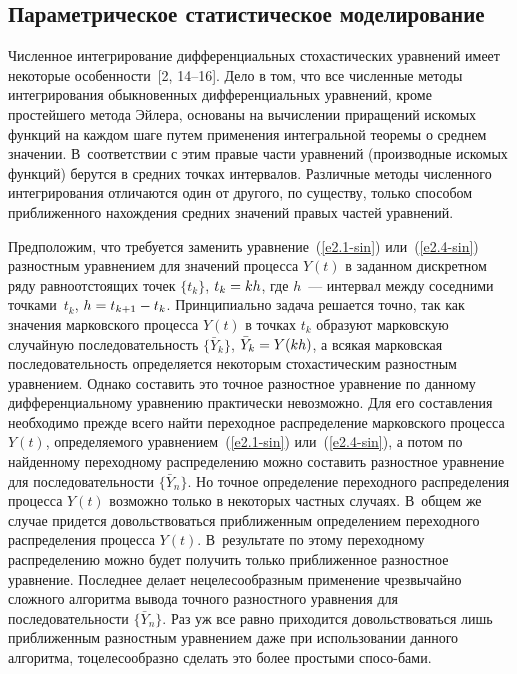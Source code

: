 \begin{multicols}{2}
\vspace*{-9pt}

\section{Параметрическое статистическое моделирование}

\vspace*{-2pt}

Численное интегрирование  дифференциальных стохастических
уравнений имеет некоторые особенности~[2, 14--16]. Дело в том, что все чис\-лен\-ные
методы интегрирования обыкновенных дифференциальных уравнений, кроме
простейшего метода Эйлера, основаны на вычислении приращений искомых
функций на каждом шаге путем применения интегральной теоремы о среднем
значении. В~соответствии с этим правые части уравнений (производные
искомых функций) берутся в средних точках интервалов.
Различные методы численного ин\-тег\-ри\-ро\-вания отличаются один от другого, по существу,
только способом приближенного нахождения средних значений правых частей уравнений.

Предположим, что требуется заменить уравнение~(\ref{e2.1-sin}) или~(\ref{e2.4-sin})  разностным
уравнением для значений процесса $Y(t)$ в заданном дискретном ряду
равноотстоящих точек $\{t_k\}$, $t_k\hm=kh$, где $h$~--- интервал между
соседними точками~$t_k$, $h\hm=t_{k+1}\hm-t_k$. Принципиально  задача
решается точно, так как значения марковского процесса $Y(t)$ в точках
$t_k$ образуют марковскую случайную последовательность $\{\bar Y_k\}$,
$\bar Y_k\hm=Y(kh)$, а всякая марковская последовательность определяется
некоторым стохастическим разностным уравнением. Однако составить это
точное разностное уравнение по данному дифференциальному уравнению
практически невозможно. Для его составления необходимо прежде всего
найти переходное распределение марковского процесса $Y(t)$,
определяемого уравнением~(\ref{e2.1-sin}) или~(\ref{e2.4-sin}), а потом по найденному переходному
распределению можно составить разностное уравнение для
последовательности $\{\bar Y_n\}$. Но точное определение переходного
распределения процесса $Y(t)$ возможно только в некоторых частных
случаях. В~общем же случае придется довольствоваться приближенным
определением переходного распределения процесса $Y(t)$. В~результате
по этому переходному распределению можно будет получить только
приближенное разностное уравнение. Последнее делает нецелесообразным
применение чрезвычайно сложного алгоритма вывода точного разностного
уравнения для последовательности $\{\bar Y_n\}$. Раз уж все равно
приходится довольствоваться лишь приближенным разностным уравнением\linebreak
даже при использовании данного алгоритма, то\linebreak целесообразно сделать это
более простыми спосо-\linebreak бами.


\end{multicols}
